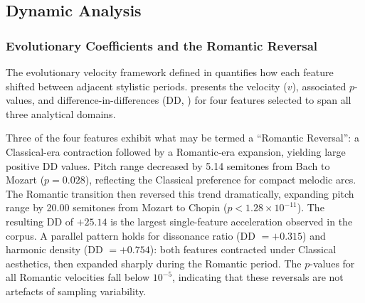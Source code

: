 \documentclass[]{interact}
\theoremstyle{plain}
\theoremstyle{definition}
\theoremstyle{remark}
\begin{document}
\subsection{Dynamic Analysis}

\subsubsection{Evolutionary Coefficients and the Romantic Reversal}

The evolutionary velocity framework defined in  quantifies
how each feature shifted between adjacent stylistic periods. 
presents the velocity ($v$), associated $p$-values, and
difference-in-differences (DD, ) for four features selected to
span all three analytical domains.

\begin{table}[ht]
\label{tab:evolution}
\end{table}

Three of the four features exhibit what may be termed a ``Romantic Reversal'':
a Classical-era contraction followed by a Romantic-era expansion, yielding
large positive DD values. Pitch range decreased by 5.14 semitones from Bach to
Mozart ($p = 0.028$), reflecting the Classical preference for compact melodic
arcs. The Romantic transition then reversed this trend dramatically, expanding
pitch range by 20.00 semitones from Mozart to Chopin
($p < 1.28 \times 10^{-11}$). The resulting DD of $+25.14$ is the largest
single-feature acceleration observed in the corpus. A parallel pattern holds
for dissonance ratio (DD $= +0.315$) and harmonic density (DD $= +0.754$):
both features contracted under Classical aesthetics, then expanded sharply
during the Romantic period. The $p$-values for all Romantic velocities fall
below $10^{-5}$, indicating that these reversals are not artefacts of sampling
variability.
\end{document}
